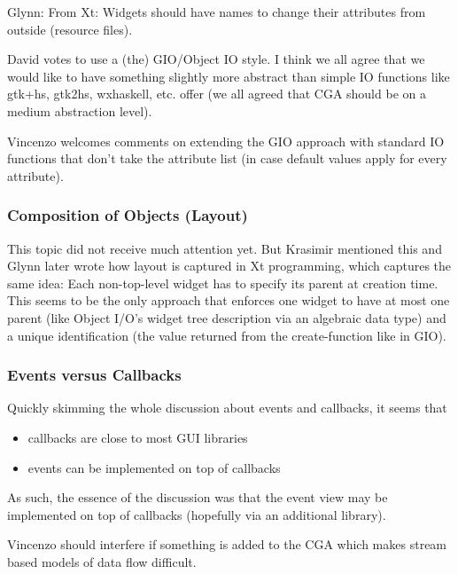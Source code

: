 \documentclass{article}
\begin{document}
Glynn: From Xt: Widgets should have names to change their attributes
from outside (resource files).

David votes to use a (the) GIO/Object IO style. I think we all agree
that we would like to have something slightly more abstract than
simple IO functions like gtk+hs, gtk2hs, wxhaskell, etc. offer (we all
agreed that CGA should be on a medium abstraction level).

Vincenzo welcomes comments on extending the GIO approach with standard
IO functions that don't take the attribute list (in case default
values apply for every attribute).

\subsubsection{\label{secParentAsParameter} Composition of Objects
  (Layout)}

This topic did not receive much attention yet. But Krasimir mentioned
this and Glynn later wrote how layout is captured in Xt programming,
which captures the same idea: Each non-top-level widget has to specify
its parent at creation time. This seems to be the only approach that
enforces one widget to have at most one parent (like Object I/O's
widget tree description via an algebraic data type) and a unique
identification (the value returned from the create-function like in
GIO).

\subsubsection{Events versus Callbacks}
Quickly skimming the whole discussion about events and callbacks, it
seems that
\begin{itemize}
\item callbacks are close to most GUI libraries
\item events can be implemented on top of callbacks
\end{itemize}
As such, the essence of the discussion was that the event view may be
implemented on top of callbacks (hopefully via an additional library).

Vincenzo should interfere if something is added to the CGA which makes
stream based models of data flow difficult.
\end{document}
